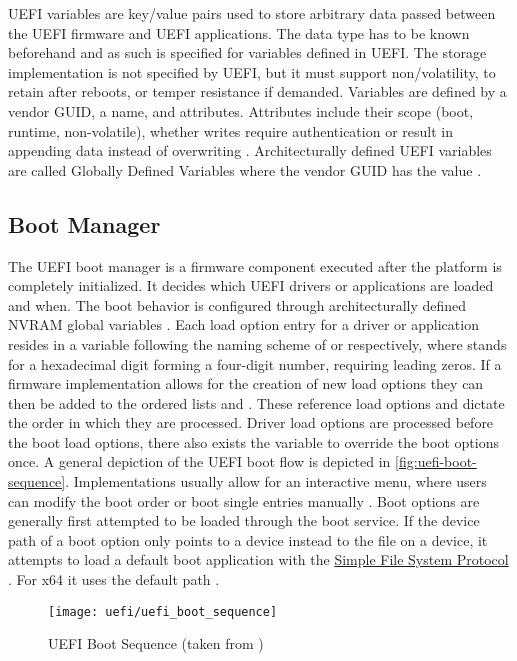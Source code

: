 \ac{UEFI} variables are key/value pairs used to store arbitrary data passed between the \ac{UEFI} firmware and \ac{UEFI} applications.
The data type has to be known beforehand and as such is specified for variables defined in \ac{UEFI}.
The storage implementation is not specified by \ac{UEFI}, but it must support non\-/volatility, to retain after reboots, or temper resistance if demanded.
Variables are defined by a vendor \ac{GUID}, a name, and attributes.
Attributes include their scope (boot, runtime, non-volatile), whether writes require authentication or result in appending data instead of overwriting \cite[Section 8.2]{uefi-spec}.
Architecturally defined \ac{UEFI} variables are called Globally Defined Variables where the vendor \ac{GUID} has the value  \cite[Section 3.3]{uefi-spec}.

\subsection{Boot Manager}
\label{sec:uefi-pi:uefi:boot-manager}

The \ac{UEFI} boot manager is a firmware component executed after the platform is completely initialized.
It decides which \ac{UEFI} drivers or applications are loaded and when.
The boot behavior is configured through architecturally defined \ac{NVRAM} global variables \cite[Section 3.1]{uefi-spec}.
Each load option entry for a driver or application resides in a variable following the naming scheme of  or  respectively, where \code{\#} stands for a hexadecimal digit forming a four-digit number, requiring leading zeros.
If a firmware implementation allows for the creation of new load options they can then be added to the ordered lists  and .
These reference load options and dictate the order in which they are processed.
Driver load options are processed before the boot load options, there also exists the  variable to override the boot options once.
A general depiction of the \ac{UEFI} boot flow is depicted in \autoref{fig:uefi-boot-sequence}.
Implementations usually allow for an interactive menu, where users can modify the boot order or boot single entries manually \cite[Section 3.1.1]{uefi-spec}.
Boot options are generally first attempted to be loaded through the  boot service.
If the device path of a boot option only points to a device instead to the file on a device, it attempts to load a default boot application with the \hyperref[lst:simple-file-system-protocol]{Simple File System Protocol} \cite[Section 3.1.2]{uefi-spec}. For x64 it uses the default path  \cite[Section 3.5]{uefi-spec}.

\begin{figure}[htb]%
    \centering%
    \texttt{[image: uefi/uefi\_boot\_sequence]}%
    \caption[\acs{UEFI} Boot Sequence]{\acs{UEFI} Boot Sequence (taken from \cite[Figure 2-1]{uefi-spec})}%
    \label{fig:uefi-boot-sequence}%
\end{figure}
